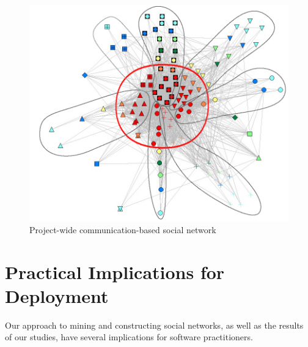 \documentclass[12pt,oneside]{book}
\begin{document}
\begin{figure}[t]
\begin{center}
\includegraphics[width=0.99\columnwidth]{./figures/JazzProjectSN}
\caption{Project-wide communication-based social network}
\label{fig:JazzProjectSN}
\end{center}
\end{figure}







\section{Practical Implications for Deployment} 

Our approach to mining and constructing social networks, as well as the results
of our studies, have several implications for software practitioners.
\end{document}
